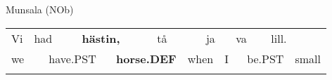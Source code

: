 
\begin{listWWNumileveli}
\item 

\begin{styleExample}
Munsala (NOb)

\end{styleExample}

\end{listWWNumileveli}

\begin{listWWNumxlviileveli}
\item 

\end{listWWNumxlviileveli}

\begin{tabular}{llllllllllllll}
\lsptoprule
Vi & \multicolumn{2}{l}{had

} & \multicolumn{2}{l}{{\bfseries hästin,}

} & \multicolumn{2}{l}{tå

} & \multicolumn{2}{l}{ja

} & \multicolumn{2}{l}{va

} & \multicolumn{2}{l}{lill.

} & \\
\multicolumn{2}{l}{we

} & \multicolumn{2}{l}{have.PST

} & \multicolumn{2}{l}{{\bfseries horse.DEF}

} & \multicolumn{2}{l}{when

} & \multicolumn{2}{l}{I 

} & \multicolumn{2}{l}{be.PST

} & \multicolumn{2}{l}{small

}\\
\lspbottomrule
\end{tabular}

